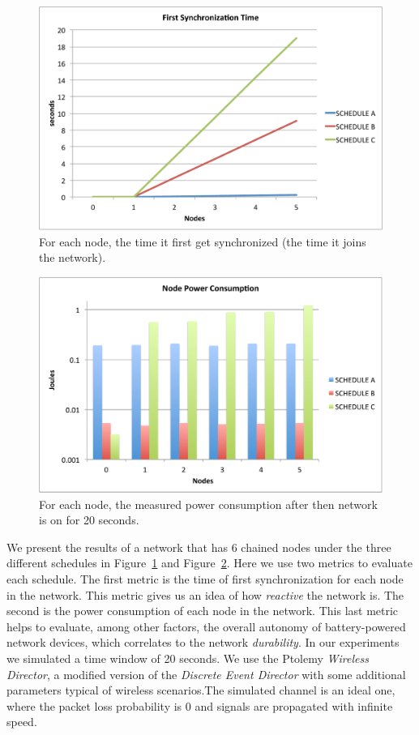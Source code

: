\begin{figure}[t]
\centering
\includegraphics[width=0.9\columnwidth]{figures/synch_time_sched_big}
\caption{\small For each node, the time it first get synchronized (the time it joins the network).}
\label{fig:time_sync}
\end{figure}

\begin{figure}[t]
\centering
\includegraphics[width=0.9\columnwidth]{figures/power_cons_big}
\caption{\small For each node, the measured power consumption after then network is on for 20 seconds.}
\label{fig:power_evaluation}
\end{figure}

We present the results of a network that has 6 chained nodes under the three different schedules in Figure~\ref{fig:time_sync} and Figure~\ref{fig:power_evaluation}. Here we use two metrics to evaluate each schedule. The first metric is the time of first synchronization for each node in the network. This metric gives us an idea of how \emph{reactive} the network is. The second is the power consumption of each node in the network. This last metric helps to evaluate, among other factors, the overall autonomy of battery-powered network devices, which correlates to the network {\em durability}.
In our experiments we simulated a time window of 20 seconds. We use the Ptolemy \emph{Wireless Director}, a modified version of the \emph{Discrete Event Director} with some additional parameters typical of wireless scenarios.The simulated channel is an ideal one, where the packet loss probability is 0 and signals are propagated with infinite speed.

